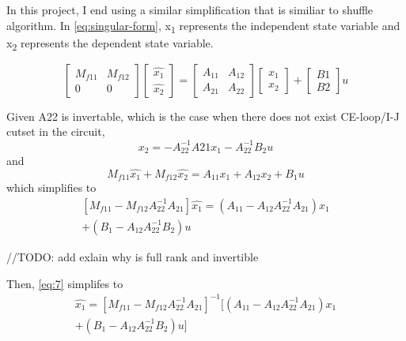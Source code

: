 \documentclass[conference]{IEEEtran}
\begin{document}
In this project, I end using a similar simplification that is similiar to shuffle algorithm.
In \eqref{eq:singular-form}, x\textsubscript{1} represents the independent state variable and x\textsubscript{2} represents the dependent state variable.

\begin{equation}
  \begin{bmatrix}
    M_{f11} & M_{f12} \\
    0  & 0  
  \end{bmatrix}
  \begin{bmatrix}
    \hat{x_{1}}\\
    \hat{x_{2}}
  \end{bmatrix}
  = 
  \begin{bmatrix}
    A_{11} & A_{12} \\
    A_{21} & A_{22}    
  \end{bmatrix}
  \begin{bmatrix}
    x_{1} \\
    x_{2}
  \end{bmatrix}
  +
  \begin{bmatrix}
    B1 \\
    B2
  \end{bmatrix}
  u
  \label{eq:singular-form}
\end{equation}


Given A22 is invertable, which is the case when there does not exist CE-loop/I-J cutset \cite{LOChua} in the circuit,
\begin{equation}
  x_{2} = -A_{22}^{-1}A21x_{1}-A_{22}^{-1}B_{2}u
  \label{eq:5}
\end{equation}
and
\begin{equation}
  M_{f11}\hat{x_{1}}+M_{f12}\hat{x_{2}} = A_{11}x_{1}+A_{12}x_{2}+B_{1}u
\end{equation}
which simplifies to
\begin{equation}
  \begin{aligned}
    [M_{f11}-M_{f12}A^{-1}_{22}A_{21}]\hat{x_{1}} = (A_{11}-A_{12}A_{22}^{-1}A_{21})x_{1} \\
     +(B_{1}-A_{12}A_{22}^{-1}B_{2})u
  \end{aligned}
  \label{eq:7}
\end{equation}

//TODO: add exlain why is full rank and invertible

Then, \eqref{eq:7} simplifes to 
\begin{equation}
  \begin{aligned}
  \hat{x_{1}} = [M_{f11}-M_{f12}A^{-1}_{22}A_{21}]^{-1} [ (A_{11}-A_{12}A_{22}^{-1}A_{21})x_{1} \\
  +(B_{1}-A_{12}A_{22}^{-1}B_{2})u ]
  \end{aligned}
  \label{eq:8}
\end{equation} 
\end{document}
